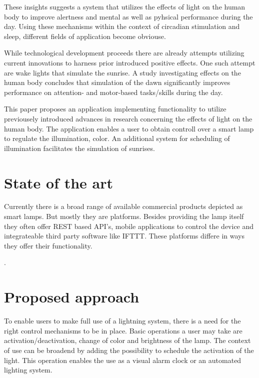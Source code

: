 \documentclass[conference]{IEEEtran}
\begin{document}
These insights suggests a system that utilizes the effects of light on the human body to improve alertness and mental as well as
pyhsical performance during the day. Using these mechanisms within the context of circadian stimulation and sleep, different
fields of application become obviouse.

While technological development proceeds there are already attempts utilizing current innovations to harness prior introduced 
positive effects. One such attempt are wake lights that simulate the sunrise. A study investigating effects on the human body
concludes that simulation of the dawn significantly improves performance on attention- and motor-based tasks/skills during the day.
\cite{Gabel2015a}

This paper proposes an application implementing functionality to utilize previousely introduced advances in research 
concerning the effects of light on the human body. The application enables a user to obtain controll over a smart lamp
to regulate the illumination, color. An additional system for scheduling of illumination facilitates the simulation of sunrises.

\section{State of the art}
Currently there is a broad range of available commercial products depicted as smart lamps. But mostly they are platforms.
Besides providing the lamp itself they often offer REST based API's, mobile applications to control the device and integrateable
third party software like IFTTT. These platforms differe in ways they offer their functionality. 

.\cite{higuera2018}



\cite{nur2018} \cite{philips19}



\section{Proposed approach}
To enable users to make full use of a lightning system, there is a need for the right control mechanisms to be in place.
Basic operations a user may take are activation/deactivation, change of color and brightness of the lamp. The context of use can
be broadend by adding the possibility to schedule the activation of the light. This operation enables the use as a visual alarm
clock or an automated lighting system. 
\end{document}

